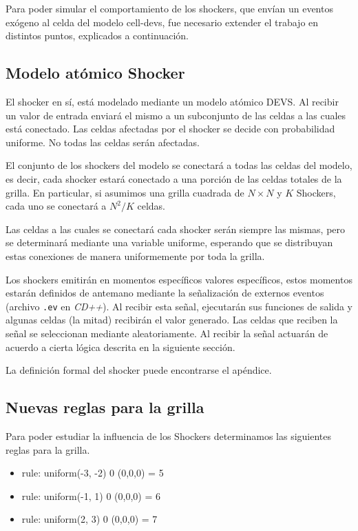 Para poder simular el comportamiento de los shockers, que envían un eventos exógeno al celda del modelo cell-devs, fue necesario extender el trabajo en distintos puntos, explicados a continuación.

\subsection{Modelo atómico Shocker}

El shocker en sí, está modelado mediante un modelo atómico DEVS. Al recibir un valor de entrada enviará el mismo a un subconjunto de las celdas a las cuales está conectado. Las celdas afectadas por el shocker se decide con probabilidad uniforme. No todas las celdas serán afectadas.

El conjunto de los shockers del modelo se conectará a todas las celdas del modelo, es decir, cada shocker estará conectado a una porción de las celdas totales de la grilla. En particular, si asumimos una grilla cuadrada de $N \times N$ y $K$ Shockers, cada uno se conectará a $N^2/K$ celdas.

Las celdas a las cuales se conectará cada shocker serán siempre las mismas, pero se determinará mediante una variable uniforme, esperando que se distribuyan estas conexiones de manera uniformemente por toda la grilla.

Los shockers emitirán en momentos específicos valores específicos, estos momentos estarán definidos de antemano mediante la señalización de externos eventos (archivo \texttt{.ev} en \textit{CD++}). Al recibir esta señal, ejecutarán sus funciones de salida y algunas celdas (la mitad) recibirán el valor generado. Las celdas que reciben la señal se seleccionan mediante aleatoriamente. Al recibir la señal actuarán de acuerdo a cierta lógica descrita en la siguiente sección.

La definición formal del shocker puede encontrarse el apéndice.

\subsection{Nuevas reglas para la grilla}

Para poder estudiar la influencia de los Shockers determinamos las siguientes reglas para la grilla.

\begin{itemize}
    \item rule: {  uniform(-3, -2) } 0 { (0,0,0) = 5 }
    \item rule: {  uniform(-1, 1)  } 0 { (0,0,0) = 6 }
    \item rule: {  uniform(2, 3) } 0 { (0,0,0) = 7 } 
\end{itemize}

